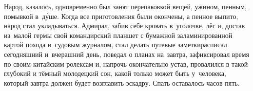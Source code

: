Народ, казалось, одновременно был занят перепаковкой вещей, ужином, пенным, помывкой в~д\'{у}ше. Когда все приготовления были окончены, а пенное выпито, народ стал укладываться. Адмирал, забив себе кровать в~уголочке, лёг и, достав из~малой гермы свой командирский планшет с бумажной заламинированной картой похода и~судовым журналом, стал делать путевые заметки\mdash расписал сегодняшний и~вчерашний день, поведал о планах на~завтра, зафиксировал время по своим китайским ролексам и, напрочь окончательно устав, провалился в такой глубокий и тёмный молодецкий сон, какой только может быть у~человека, который завтра должен будет возглавить эскадру. Спать оставалось часов пять.

\begin{center}
\end{center}

 






